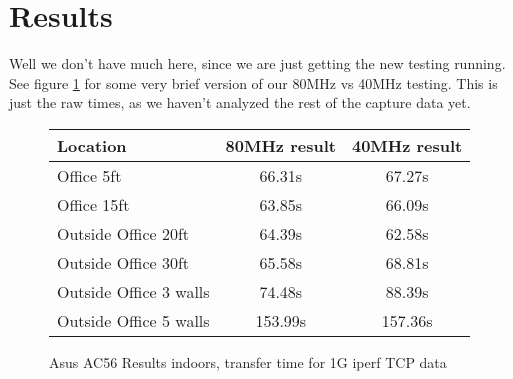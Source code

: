 \section{Results}
Well we don't have much here, since we are just getting the new testing running.
\\
See figure \ref{fig} for some very brief version of our 80MHz vs
40MHz testing. This is just the raw times, as we haven't analyzed the
rest of the capture data yet.

\begin{figure}
\begin{tabular}{| l || c | c |}
\hline
Location & 80MHz result & 40MHz result \\\hline
Office 5ft & 66.31s & 67.27s \\\hline
Office 15ft & 63.85s & 66.09s \\\hline
Outside Office 20ft & 64.39s & 62.58s \\\hline
Outside Office 30ft & 65.58s & 68.81s \\\hline
Outside Office 3 walls & 74.48s & 88.39s \\\hline
Outside Office 5 walls & 153.99s & 157.36s \\ \hline
\end{tabular}
\caption{Asus AC56 Results indoors, transfer time for 1G iperf TCP data}
\label{fig}
\end{figure}
